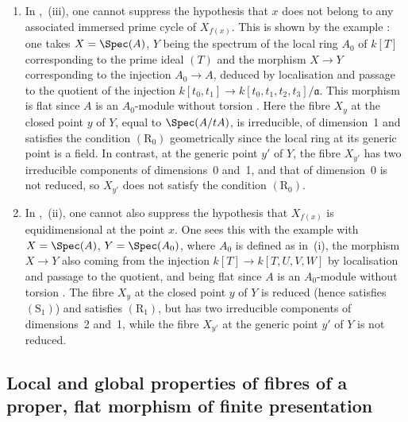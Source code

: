 \begin{remarks}[12.1.8]
\label{IV.12.1.8}
\begin{enumerate}[label=(\roman*)]
  \item In ,~(iii), one cannot suppress the hypothesis that $x$ does not belong to any associated immersed prime cycle of $X_{f(x)}$.
This is shown by the example : one takes $X=\Spec(A)$, $Y$ being the spectrum of the local ring $A_0$ of $k[T]$ corresponding to the prime ideal $(T)$ and the morphism $X\to Y$ corresponding to the injection $A_0\to A$, deduced by localisation and passage to the quotient of the injection $k[t_0,t_1]\to k[t_0,t_1,t_2,t_3]/\mathfrak{a}$.
This morphism is flat since $A$ is an $A_0$-module without torsion .
Here the fibre $X_y$ at the closed point $y$ of $Y$, equal to $\Spec(A/tA)$, is irreducible, of dimension~1 and satisfies the condition $(\mathrm{R}_0)$ geometrically since the local ring at its generic point is a field.
In contrast, at the generic point $y'$ of $Y$, the fibre $X_{y'}$ has two irreducible components of dimensions~0 and~1, and that of dimension~0 is not reduced, so $X_{y'}$ does not satisfy the condition $(\mathrm{R}_0)$.

  \item In ,~(ii), one cannot also suppress the hypothesis that $X_{f(x)}$ is equidimensional at the point $x$.
One sees this with the example  with $X=\Spec(A)$, $Y=\Spec(A_0)$, where $A_0$ is defined as in~(i), the morphism $X\to Y$ also coming from the injection $k[T]\to k[T,U,V,W]$ by localisation and passage to the quotient, and being flat since $A$ is an $A_0$-module without torsion .
The fibre $X_y$ at the closed point $y$ of $Y$ is reduced (hence satisfies $(\mathrm{S}_1)$) and satisfies $(\mathrm{R}_1)$, but has two irreducible components of dimensions~2 and~1, while the fibre $X_{y'}$ at the generic point $y'$ of $Y$ is not reduced.
\end{enumerate}
\end{remarks}


\subsection{Local and global properties of fibres of a proper, flat morphism of finite presentation}
\label{subsection:IV.12.2}


